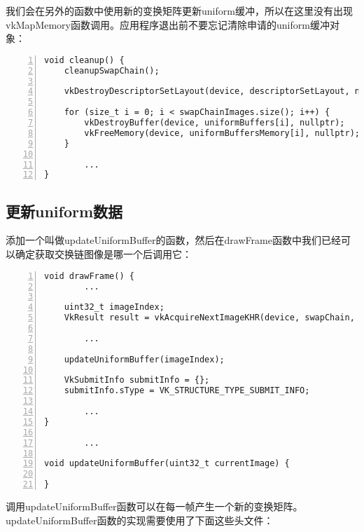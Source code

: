\documentclass{ctexart}
\begin{document}
我们会在另外的函数中使用新的变换矩阵更新uniform缓冲，所以在这里没有出现vkMapMemory函数调用。应用程序退出前不要忘记清除申请的uniform缓冲对象：

\begin{lstlisting}[language={[ANSI]C},keywordstyle=\color{blue!70},commentstyle=\color{red!50!green!50!blue!50},frame=shadowbox, rulesepcolor=\color{red!20!green!20!blue!20},basicstyle=\small,numbers=left, numberstyle=\tiny,breaklines=true]
void cleanup() {
	cleanupSwapChain();

	vkDestroyDescriptorSetLayout(device, descriptorSetLayout, nullptr);

	for (size_t i = 0; i < swapChainImages.size(); i++) {
		vkDestroyBuffer(device, uniformBuffers[i], nullptr);
		vkFreeMemory(device, uniformBuffersMemory[i], nullptr);
	}

		...
}
\end{lstlisting}

\subsection{更新uniform数据}

添加一个叫做updateUniformBuffer的函数，然后在drawFrame函数中我们已经可以确定获取交换链图像是哪一个后调用它：

\begin{lstlisting}[language={[ANSI]C},keywordstyle=\color{blue!70},commentstyle=\color{red!50!green!50!blue!50},frame=shadowbox, rulesepcolor=\color{red!20!green!20!blue!20},basicstyle=\small,numbers=left, numberstyle=\tiny,breaklines=true]
void drawFrame() {
		...

	uint32_t imageIndex;
	VkResult result = vkAcquireNextImageKHR(device, swapChain, std::numeric_limits<uint64_t>::max(), imageAvailableSemaphores[currentFrame], VK_NULL_HANDLE, &imageIndex);

		...

	updateUniformBuffer(imageIndex);

	VkSubmitInfo submitInfo = {};
	submitInfo.sType = VK_STRUCTURE_TYPE_SUBMIT_INFO;

		...
}

		...

void updateUniformBuffer(uint32_t currentImage) {

}
\end{lstlisting}

调用updateUniformBuffer函数可以在每一帧产生一个新的变换矩阵。updateUniformBuffer函数的实现需要使用了下面这些头文件：
\end{document}
